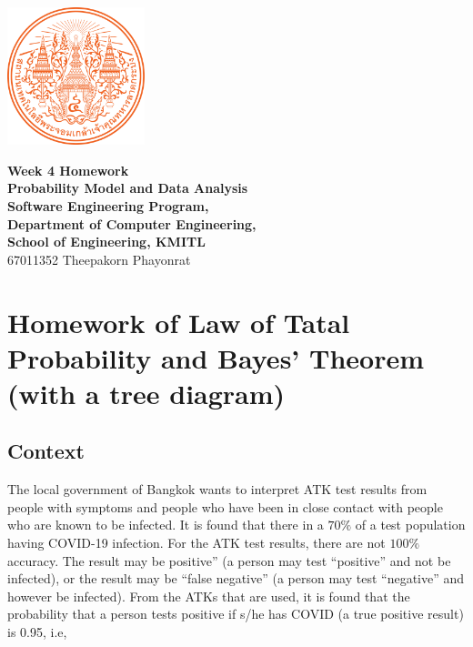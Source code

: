 \documentclass[12pt]{report} %
\begin{document}
\begin{titlepage}
	\centering
	\vspace*{1cm} %
	\includegraphics[width=0.3\textwidth]{../images/KMITL Logo.png} %

	\vspace{1cm} %
	{\LARGE \textbf{Week 4 Homework}} \\[0.5cm] %
	\vspace{0.5cm}
	{\large \textbf{Probability Model and Data Analysis}} \\[0.5cm]
    {\large \textbf{Software Engineering Program,}} \\[0.5cm]
	{\large \textbf{Department of Computer Engineering,}} \\[0.5cm]
	{\large \textbf{School of Engineering, KMITL}} \\[1cm]
	{\large 67011352 Theepakorn Phayonrat} \\[0.5cm] %
\end{titlepage}

\section*{Homework of Law of Tatal Probability and Bayes' Theorem (with a tree diagram)}

\subsection*{Context}

The local government of Bangkok wants to interpret ATK test results
from people with symptoms and people who have been in close contact
with people who are known to be infected. It is found that there in
a $70\%$ of a test population having COVID-19 infection. For the ATK
test results, there are not $100\%$ accuracy. The result may be
positive” (a person may test “positive” and not be infected), or the
result may be “false negative” (a person may test “negative” and
however be infected). From the ATKs that are used, it is found that
the probability that a person tests positive if s/he has COVID (a true
positive result) is 0.95, i.e,
\end{document}
